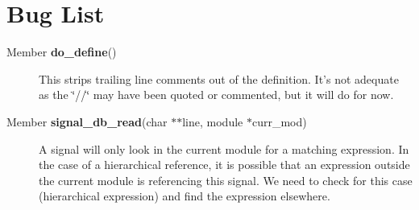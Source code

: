 \section{Bug List}\label{bug}
\begin{description}
\item[\label{_bug000001}
Member {\bf do\_\-define}() ]
This strips trailing line comments out of the definition. It's not adequate as the \char`\"{}//\char`\"{} may have been quoted or commented, but it will do for now.\end{description}


\begin{description}
\item[\label{_bug000002}
Member {\bf signal\_\-db\_\-read}(char $\ast$$\ast$line, module $\ast$curr\_\-mod) ]
A signal will only look in the current module for a matching expression. In the case of a hierarchical reference, it is possible that an expression outside the current module is referencing this signal. We need to check for this case (hierarchical expression) and find the expression elsewhere.\end{description}
 